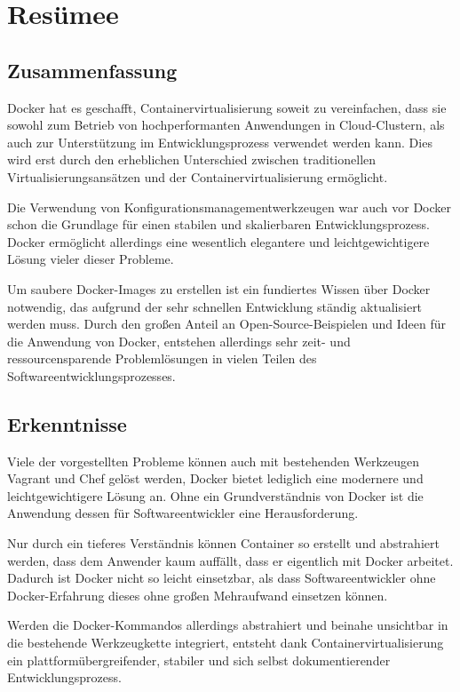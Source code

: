 \chapter{Resümee}
\section{Zusammenfassung}
Docker hat es geschafft, Containervirtualisierung soweit zu vereinfachen, dass sie sowohl zum Betrieb von hochperformanten Anwendungen in Cloud-Clustern, als auch zur Unterstützung im Entwicklungsprozess verwendet werden kann.
Dies wird erst durch den erheblichen Unterschied zwischen traditionellen Virtualisierungsansätzen und der Containervirtualisierung ermöglicht.

Die Verwendung von Konfigurationsmanagementwerkzeugen war auch vor Docker schon die Grundlage für einen stabilen und skalierbaren Entwicklungsprozess.
Docker ermöglicht allerdings eine wesentlich elegantere und leichtgewichtigere Lösung vieler dieser Probleme.

Um saubere Docker-Images zu erstellen ist ein fundiertes Wissen über Docker notwendig, das aufgrund der sehr schnellen Entwicklung ständig aktualisiert werden muss.
Durch den großen Anteil an Open-Source-Beispielen und Ideen für die Anwendung von Docker, entstehen allerdings sehr zeit- und ressourcensparende Problemlösungen in vielen Teilen des Softwareentwicklungsprozesses.

\section{Erkenntnisse}
Viele der vorgestellten Probleme können auch mit bestehenden Werkzeugen Vagrant und Chef gelöst werden, Docker bietet lediglich eine modernere und leichtgewichtigere Lösung an.
Ohne ein Grundverständnis von Docker ist die Anwendung dessen für Softwareentwickler eine Herausforderung.

Nur durch ein tieferes Verständnis können Container so erstellt und abstrahiert werden, dass dem Anwender kaum auffällt, dass er eigentlich mit Docker arbeitet.
Dadurch ist Docker nicht so leicht einsetzbar, als dass Softwareentwickler ohne Docker-Erfahrung dieses ohne großen Mehraufwand einsetzen können.

Werden die Docker-Kommandos allerdings abstrahiert und beinahe unsichtbar in die bestehende Werkzeugkette integriert, entsteht dank Containervirtualisierung ein plattformübergreifender, stabiler und sich selbst dokumentierender Entwicklungsprozess.


